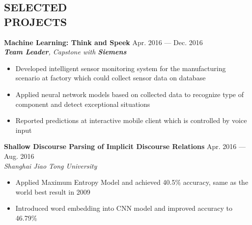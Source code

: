 \documentclass[margin,line,11pt]{res}
\begin{document}
\begin{resume}
\section{SELECTED\\PROJECTS}
{
\small
{\bf Machine Learning: Think and Speek} \hfill Apr. 2016 --- Dec. 2016\\
{\it \textbf{Team Leader}, Capstone with {\bf Siemens}}
}
\begin{itemize}
\setlength{\itemsep}{0pt}
\setlength{\parskip}{0pt}
\setlength{\parsep}{0pt}
\item {\small Developed intelligent sensor monitoring system for the manufacturing scenario at factory which could collect sensor data on database}
\item {\small Applied neural network models based on collected data to recognize type of component and detect exceptional situations}
\item {\small Reported predictions at interactive mobile client which is controlled by voice input}
\end{itemize}
{
\small
{\bf Shallow Discourse Parsing of Implicit Discourse Relations} \hfill Apr. 2016 ---  Aug. 2016\\
{\it Shanghai Jiao Tong University}
}
\begin{itemize}
\setlength{\itemsep}{0pt}
\setlength{\parskip}{0pt}
\setlength{\parsep}{0pt}
\item {\small Applied Maximum Entropy Model and achieved 40.5\% accuracy, same as the world best result in 2009}
\item {\small Introduced word embedding into CNN model and improved accuracy to 46.79\%}
\end{itemize}


\end{resume}
\end{document}
